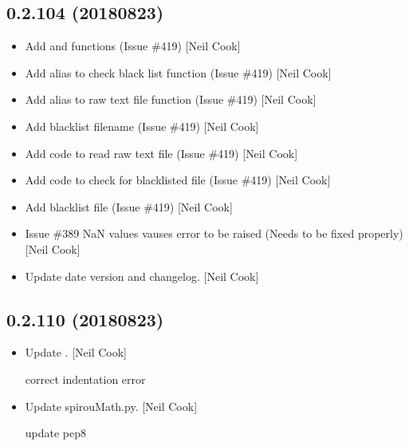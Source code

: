 \documentclass[a4paper,10pt,english]{report}
\begin{document}
\subsection{0.2.104 (2018\sphinxhyphen{}08\sphinxhyphen{}23)}
\label{\detokenize{misc/changelog:id374}}\begin{itemize}
\item {} 
Add  and  functions (Issue \#419) {[}Neil
Cook{]}

\item {} 
Add alias to check black list function (Issue \#419) {[}Neil Cook{]}

\item {} 
Add alias to raw text file function (Issue \#419) {[}Neil Cook{]}

\item {} 
Add blacklist filename (Issue \#419) {[}Neil Cook{]}

\item {} 
Add code to read raw text file (Issue \#419) {[}Neil Cook{]}

\item {} 
Add code to check for blacklisted file (Issue \#419) {[}Neil Cook{]}

\item {} 
Add blacklist file (Issue \#419) {[}Neil Cook{]}

\item {} 
Issue \#389 \sphinxhyphen{} NaN values vauses error to be raised (Needs to be fixed
properly) {[}Neil Cook{]}

\item {} 
Update date version and changelog. {[}Neil Cook{]}

\end{itemize}


\subsection{0.2.110 (2018\sphinxhyphen{}08\sphinxhyphen{}23)}
\label{\detokenize{misc/changelog:id375}}\begin{itemize}
\item {} 
Update . {[}Neil Cook{]}

correct indentation error

\item {} 
Update spirouMath.py. {[}Neil Cook{]}

update pep8

\end{itemize}
\end{document}
